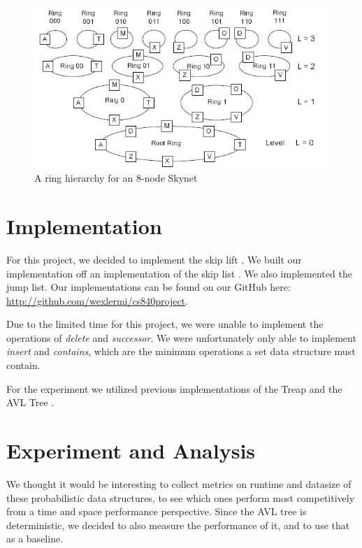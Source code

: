 \documentclass[oribibl]{llncs}
\begin{document}
\begin{figure}[here]
\center
\includegraphics[width=12cm]{images/skynet1}
\caption{A ring hierarchy for an 8-node Skynet}
\label{fig:skynet1}
\end{figure}


\section{Implementation}
\label{sctn:implementation}

For this project, we decided to implement the skip lift \cite{skip_lift}. We built our implementation off an implementation of the skip list \cite{skip_list_imp}. We also implemented the jump list\cite{jump_list}.  Our implementations can be found on our GitHub here: \url{http://github.com/wexlermi/cs840project}.

Due to the limited time for this project, we were unable to implement the operations of {\it delete} and {\it successor}. We were unfortunately only able to implement {\it insert} and {\it contains}, which are the minimum operations a set data structure must contain.

For the experiment we utilized previous implementations of the Treap \cite{treap_imp} and the AVL Tree \cite{avl_tree_imp}.

 \section{Experiment and Analysis}
\label{sctn:experiment}

We thought it would be interesting to collect metrics on runtime and datasize of these probabilistic data structures, to see which ones perform most competitively from a time and space performance perspective. Since the AVL tree is deterministic, we decided to also measure the performance of it, and to use that as a baseline.
\end{document}
